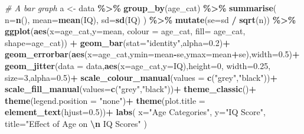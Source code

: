 \documentclass[
]{book}
\newenvironment{Shaded}{\begin{snugshade}}{\end{snugshade}}
\newcommand{\AttributeTok}[1]{\textcolor[rgb]{0.13,0.29,0.53}{#1}}
\newcommand{\CommentTok}[1]{\textcolor[rgb]{0.56,0.35,0.01}{\textit{#1}}}
\newcommand{\DecValTok}[1]{\textcolor[rgb]{0.00,0.00,0.81}{#1}}
\newcommand{\FloatTok}[1]{\textcolor[rgb]{0.00,0.00,0.81}{#1}}
\newcommand{\FunctionTok}[1]{\textcolor[rgb]{0.13,0.29,0.53}{\textbf{#1}}}
\newcommand{\NormalTok}[1]{#1}
\newcommand{\OtherTok}[1]{\textcolor[rgb]{0.56,0.35,0.01}{#1}}
\newcommand{\SpecialCharTok}[1]{\textcolor[rgb]{0.81,0.36,0.00}{\textbf{#1}}}
\newcommand{\StringTok}[1]{\textcolor[rgb]{0.31,0.60,0.02}{#1}}
\begin{document}
\begin{Shaded}
\begin{Highlighting}[]
\CommentTok{\# A bar graph}
\NormalTok{a }\OtherTok{\textless{}{-}}\NormalTok{ data }\SpecialCharTok{\%\textgreater{}\%}
  \FunctionTok{group\_by}\NormalTok{(age\_cat) }\SpecialCharTok{\%\textgreater{}\%}
  \FunctionTok{summarise}\NormalTok{(}
    \AttributeTok{n=}\FunctionTok{n}\NormalTok{(),}
    \AttributeTok{mean=}\FunctionTok{mean}\NormalTok{(IQ),}
    \AttributeTok{sd=}\FunctionTok{sd}\NormalTok{(IQ)}
\NormalTok{  ) }\SpecialCharTok{\%\textgreater{}\%} \FunctionTok{mutate}\NormalTok{(}\AttributeTok{se=}\NormalTok{sd }\SpecialCharTok{/} \FunctionTok{sqrt}\NormalTok{(n)) }\SpecialCharTok{\%\textgreater{}\%}
  \FunctionTok{ggplot}\NormalTok{(}\FunctionTok{aes}\NormalTok{(}\AttributeTok{x=}\NormalTok{age\_cat,}\AttributeTok{y=}\NormalTok{mean, }\AttributeTok{colour =}\NormalTok{ age\_cat, }\AttributeTok{fill=}\NormalTok{ age\_cat, }\AttributeTok{shape=}\NormalTok{age\_cat)) }\SpecialCharTok{+}
  \FunctionTok{geom\_bar}\NormalTok{(}\AttributeTok{stat=}\StringTok{"identity"}\NormalTok{,}\AttributeTok{alpha=}\FloatTok{0.2}\NormalTok{)}\SpecialCharTok{+}
  \FunctionTok{geom\_errorbar}\NormalTok{(}\FunctionTok{aes}\NormalTok{(}\AttributeTok{x=}\NormalTok{age\_cat,}\AttributeTok{ymin=}\NormalTok{mean}\SpecialCharTok{{-}}\NormalTok{se,}\AttributeTok{ymax=}\NormalTok{mean}\SpecialCharTok{+}\NormalTok{se),}\AttributeTok{width=}\FloatTok{0.5}\NormalTok{)}\SpecialCharTok{+}
  \FunctionTok{geom\_jitter}\NormalTok{(}\AttributeTok{data =}\NormalTok{ data,}\FunctionTok{aes}\NormalTok{(}\AttributeTok{x=}\NormalTok{age\_cat,}\AttributeTok{y=}\NormalTok{IQ),}\AttributeTok{height=}\DecValTok{0}\NormalTok{, }\AttributeTok{width=}\FloatTok{0.25}\NormalTok{, }\AttributeTok{size=}\DecValTok{3}\NormalTok{,}\AttributeTok{alpha=}\FloatTok{0.5}\NormalTok{)}\SpecialCharTok{+}
  \FunctionTok{scale\_colour\_manual}\NormalTok{(}\AttributeTok{values =} \FunctionTok{c}\NormalTok{(}\StringTok{"grey"}\NormalTok{,}\StringTok{"black"}\NormalTok{))}\SpecialCharTok{+}
  \FunctionTok{scale\_fill\_manual}\NormalTok{(}\AttributeTok{values=}\FunctionTok{c}\NormalTok{(}\StringTok{"grey"}\NormalTok{,}\StringTok{"black"}\NormalTok{))}\SpecialCharTok{+}
  \FunctionTok{theme\_classic}\NormalTok{()}\SpecialCharTok{+}
  \FunctionTok{theme}\NormalTok{(}\AttributeTok{legend.position =} \StringTok{"none"}\NormalTok{)}\SpecialCharTok{+}
  \FunctionTok{theme}\NormalTok{(}\AttributeTok{plot.title =} \FunctionTok{element\_text}\NormalTok{(}\AttributeTok{hjust=}\FloatTok{0.5}\NormalTok{))}\SpecialCharTok{+}
  \FunctionTok{labs}\NormalTok{(}
    \AttributeTok{x=}\StringTok{"Age Categories"}\NormalTok{,}
    \AttributeTok{y=}\StringTok{"IQ Score"}\NormalTok{,}
    \AttributeTok{title=}\StringTok{"Effect of Age on }\SpecialCharTok{\textbackslash{}n}\StringTok{ IQ Scores"}
\NormalTok{  )}


\end{Highlighting}
\end{Shaded}
\end{document}
